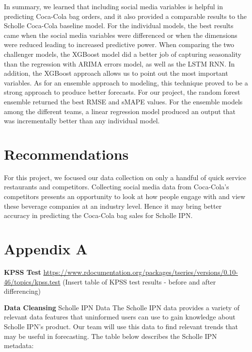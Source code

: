 \documentclass[12pt,oneside]{chicagocapstone}
\begin{document}
In summary, we learned that including social media variables is helpful
in predicting Coca-Cola bag orders, and it also provided a comparable
results to the Scholle Coca-Cola baseline model. For the individual
models, the best results came when the social media variables were
differenced or when the dimensions were reduced leading to increased
predictive power. When comparing the two challenger models, the XGBoost
model did a better job of capturing seasonality than the regression with
ARIMA errors model, as well as the LSTM RNN. In addition, the XGBoost
approach allows us to point out the most important variables. As for an
ensemble approach to modeling, this technique proved to be a strong
approach to produce better forecasts. For our project, the random forest
ensemble returned the best RMSE and sMAPE values. For the ensemble
models among the different teams, a linear regression model produced an
output that was incrementally better than any individual model.

\chapter*{Recommendations}\label{recommendations}

For this project, we focused our data collection on only a handful of
quick service restaurants and competitors. Collecting social media data
from Coca-Cola's competitors presents an opportunity to look at how
people engage with and view these beverage companies at an industry
level. Hence it may bring better accuracy in predicting the Coca-Cola
bag sales for Scholle IPN.

\newpage

\appendix

\chapter*{Appendix A}\label{appendix}

\textbf{KPSS Test}
\url{https://www.rdocumentation.org/packages/tseries/versions/0.10-46/topics/kpss.test}
(Insert table of KPSS test results - before and after differencing)

\textbf{Data Cleansing} Scholle IPN Data The Scholle IPN data provides a
variety of relevant data features that uninformed users can use to gain
knowledge about Scholle IPN's product. Our team will use this data to
find relevant trends that may be useful in forecasting. The table below
describes the Scholle IPN metadata:
\end{document}
